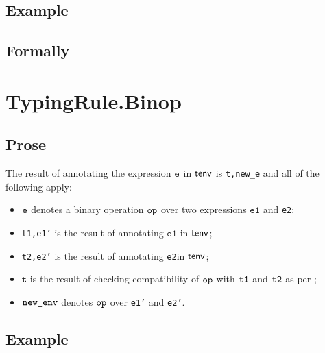 \documentclass{book}
\newcommand\vt[0]{\texttt{t}}
\newcommand\veone[0]{\texttt{e1}}
\newcommand\vetwo[0]{\texttt{e2}}
\begin{document}
  \subsection{Example}



\begin{emptyformal}
  \subsection{Formally}
\end{emptyformal}


\section{TypingRule.Binop \label{sec:TypingRule.Binop}}

  \subsection{Prose}
  The result of annotating the expression $\texttt{e}$ in $\textsf{tenv}$ is
\texttt{t,new\_e} and all of the following apply:
  \begin{itemize}
  \item $\texttt{e}$ denotes a binary operation $\texttt{op}$ over two expressions $\veone$ and \vetwo;
  \item \texttt{t1,e1'} is the result of annotating $\veone$ in $\textsf{tenv}$;
  \item \texttt{t2,e2'} is the result of annotating \vetwo in $\textsf{tenv}$;
  \item $\vt$ is the result of checking compatibility of $\texttt{op}$ with $\texttt{t1}$ and $\texttt{t2}$ as per ;
  \item $\texttt{new\_env}$ denotes $\texttt{op}$ over \texttt{e1'} and \texttt{e2'}.
  \end{itemize}

  \subsection{Example}


\end{document}
